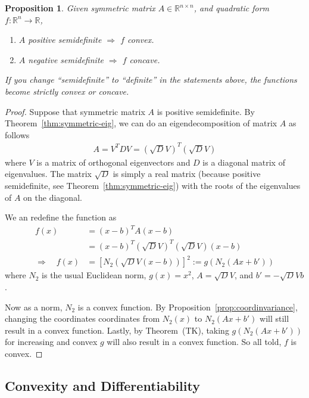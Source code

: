 \documentclass[12pt]{book}
\numberwithin{equation}{section} %
\theoremstyle{plain}
\newtheorem{prop}[thm]{Proposition}
\theoremstyle{definition}
\theoremstyle{remark}
\newcommand{\R}{\mathbb{R}}
\newcommand{\Rn}{\mathbb{R}^n}
\newcommand{\Rnn}{\mathbb{R}^{n\times n}}
\begin{document}
\begin{prop}
Given symmetric matrix $A\in\Rnn$, and quadratic form
$f:\Rn\rightarrow\R$,
\begin{enumerate}
  \item $A$ positive semidefinite $\Rightarrow$ $f$ convex.
  \item $A$ negative semidefinite $\Rightarrow$ $f$ concave.
\end{enumerate}
If you change ``semidefinite'' to ``definite'' in the statements above,
the functions become \emph{strictly} convex or concave.
\end{prop}
\begin{proof}
Suppose that symmetric matrix $A$ is positive semidefinite. By
Theorem~\ref{thm:symmetric-eig}, we can do an eigendecomposition of
matrix $A$ as follows
\begin{align*}
  A = V^T D V = \left(\sqrt{D}V\right)^T \left(\sqrt{D} V\right)
\end{align*}
where $V$ is a matrix of orthogonal eigenvectors and $D$ is a diagonal
matrix of eigenvalues. The matrix $\sqrt{D}$ is simply a real matrix
(because positive semidefinite, see
Theorem~\ref{thm:symmetric-eig}) with the roots of the
eigenvalues of $A$ on the diagonal.

We an redefine the function as
\begin{align*}
  f(x) &= (x-b)^T A (x-b) \\
  &= (x-b)^T \left(\sqrt{D}V\right)^T \left(\sqrt{D} V\right)(x-b) \\
  \Rightarrow\quad
  f(x)
  &= \left[N_2\left( \sqrt{D} V(x-b) \right)\right]^2
  := g(N_2(Ax+b'))
\end{align*}
where $N_2$ is the usual Euclidean norm, $g(x)=x^2$, $A=\sqrt{D}V$, and
$b'=-\sqrt{D}Vb$.

Now as a norm, $N_2$ is a convex function. By
Proposition~\ref{prop:coordinvariance}, changing the coordinates
coordinates from $N_2(x)$ to $N_2(Ax+b')$ will still result in a convex
function. Lastly, by Theorem~(TK), taking $g(N_2(Ax+b'))$ for increasing
and convex $g$ will also result in a convex function. So all told, $f$
is convex.
\end{proof}


\subsection{Convexity and Differentiability}
\end{document}
